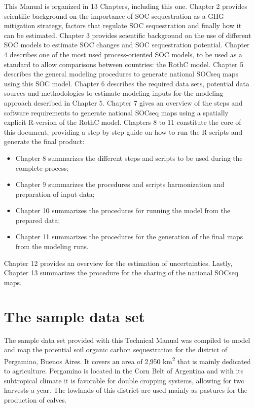\documentclass[
  10pt,
  b5paper,
]{book}
\providecommand{\tightlist}{%
  \setlength{\itemsep}{0pt}\setlength{\parskip}{0pt}}
\begin{document}
This Manual is organized in 13 Chapters, including this one. Chapter 2 provides scientific background on the importance of SOC sequestration as a GHG mitigation strategy, factors that regulate SOC sequestration and finally how it can be estimated. Chapter 3 provides scientific background on the use of different SOC models to estimate SOC changes and SOC sequestration potential. Chapter 4 describes one of the most used process-oriented SOC models, to be used as a standard to allow comparisons between countries: the RothC model. Chapter 5 describes the general modeling procedures to generate national SOCseq maps using this SOC model. Chapter 6 describes the required data sets, potential data sources and methodologies to estimate modeling inputs for the modeling approach described in Chapter 5. Chapter 7 gives an overview of the steps and software requirements to generate national SOCseq maps using a spatially explicit R-version of the RothC model. Chapters 8 to 11 constitute the core of this document, providing a step by step guide on how to run the R-scripts and generate the final product:

\begin{itemize}
\tightlist
\item
  Chapter 8 summarizes the different steps and scripts to be used during the complete process;\\
\item
  Chapter 9 summarizes the procedures and scripts harmonization and preparation of input data;\\
\item
  Chapter 10 summarizes the procedures for running the model from the prepared data;\\
\item
  Chapter 11 summarizes the procedures for the generation of the final maps from the modeling runs.
\end{itemize}

Chapter 12 provides an overview for the estimation of uncertainties. Lastly, Chapter 13 summarizes the procedure for the sharing of the national SOCseq maps.

\hypertarget{the-sample-data-set}{%
\section{The sample data set}\label{the-sample-data-set}}

The sample data set provided with this Technical Manual was compiled to model and map the potential soil organic carbon sequestration for the district of Pergamino, Buenos Aires. It covers an area of 2,950 km\textsuperscript{2} that is mainly dedicated to agriculture. Pergamino is located in the Corn Belt of Argentina and with its subtropical climate it is favorable for double cropping systems, allowing for two harvests a year. The lowlands of this district are used mainly as pastures for the production of calves.
\end{document}
